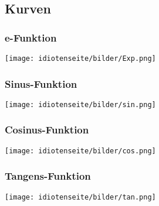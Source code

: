 \subsection{Kurven}
\begin{multicols}{4}
\subsubsection{e-Funktion}
\texttt{[image: idiotenseite/bilder/Exp.png]}
\subsubsection{Sinus-Funktion}
\texttt{[image: idiotenseite/bilder/sin.png]}
\subsubsection{Cosinus-Funktion}
\texttt{[image: idiotenseite/bilder/cos.png]}
\subsubsection{Tangens-Funktion}
\texttt{[image: idiotenseite/bilder/tan.png]}
\end{multicols}